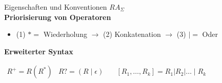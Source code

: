 \begin{KR}{Eigenschaften und Konventionen} $R A_{\Sigma}$\\
    
    \textbf{Priorisierung von Operatoren}
    \begin{itemize}
    \item (1) $*=$ Wiederholung $\rightarrow$ (2) Konkatenation $\rightarrow$ (3) $\mid=$ Oder
    \end{itemize}
    \textbf{Erweiterter Syntax}

        $
        \begin{array}{lcr}
            R^{+} = R (R^{*}) & R ?=(R \mid \epsilon) & \quad \left[R_{1}, \ldots, R_{k}\right]=R_{1}\left|R_{2}\right| \ldots \mid R_{k} 
        \end{array}
        $
\end{KR}
